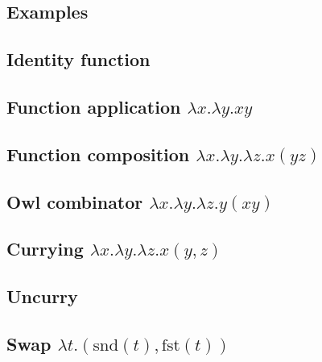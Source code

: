\documentclass[varwidth]{article}
\theoremstyle{definition}
\newcommand{\fst}{\mathrm{fst}}
\newcommand{\snd}{\mathrm{snd}}
\begin{document}
\newpage
\begin{appendices}
	
	

	
    \begin{landscape}
    	\section{Examples}
        \subsection{Identity function}
             \label{ex1}
        \subsection{Function application $\lambda x . \lambda y . x y$}
             \label{ex2}
        \subsection{Function composition $\lambda x . \lambda y . \lambda z . x ( y z)$} %
             \label{ex7}
        
        \subsection{Owl combinator $\lambda x . \lambda y . \lambda z . y (x y)$} %
        
        \subsection{Currying $\lambda x . \lambda y . \lambda z . x (y, z)$} %
             \label{ex8}
        \subsection{Uncurry}
             \label{ex9}
        
        \subsection{Swap $\lambda t . (\snd(t), \fst(t))$}
        
        
    \end{landscape}
	
\end{appendices}

 

\end{document}
